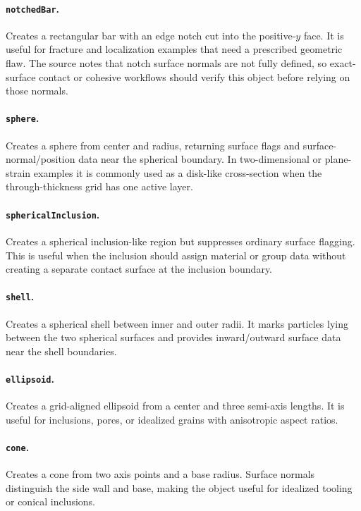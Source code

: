 \paragraph{\texttt{notchedBar}.}Creates a rectangular bar with an edge notch cut into the positive-$y$ face.  It is useful for fracture and localization examples that need a prescribed geometric flaw.  The source notes that notch surface normals are not fully defined, so exact-surface contact or cohesive workflows should verify this object before relying on those normals.

\paragraph{\texttt{sphere}.}Creates a sphere from center and radius, returning surface flags and surface-normal/position data near the spherical boundary.  In two-dimensional or plane-strain examples it is commonly used as a disk-like cross-section when the through-thickness grid has one active layer.

\paragraph{\texttt{sphericalInclusion}.}Creates a spherical inclusion-like region but suppresses ordinary surface flagging.  This is useful when the inclusion should assign material or group data without creating a separate contact surface at the inclusion boundary.

\paragraph{\texttt{shell}.}Creates a spherical shell between inner and outer radii.  It marks particles lying between the two spherical surfaces and provides inward/outward surface data near the shell boundaries.

\paragraph{\texttt{ellipsoid}.}Creates a grid-aligned ellipsoid from a center and three semi-axis lengths.  It is useful for inclusions, pores, or idealized grains with anisotropic aspect ratios.

\paragraph{\texttt{cone}.}Creates a cone from two axis points and a base radius.  Surface normals distinguish the side wall and base, making the object useful for idealized tooling or conical inclusions.

